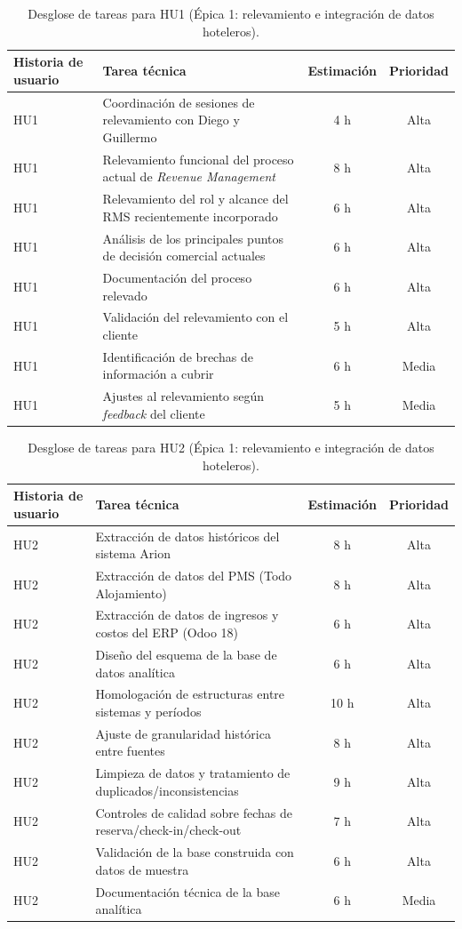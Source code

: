 \documentclass[
11pt, %
]{charter}
\begin{document}
\begin{table}[H]
\centering
\begin{tabularx}{\linewidth}{@{}|X|X|c|c|@{}}
\hline
\rowcolor[HTML]{C0C0C0}
Historia de usuario & Tarea técnica & Estimación & Prioridad \\ \hline
HU1 & Coordinación de sesiones de relevamiento con Diego y Guillermo & 4 h & Alta \\ \hline
HU1 & Relevamiento funcional del proceso actual de \textit{Revenue Management} & 8 h & Alta \\ \hline
HU1 & Relevamiento del rol y alcance del RMS recientemente incorporado & 6 h & Alta \\ \hline
HU1 & Análisis de los principales puntos de decisión comercial actuales & 6 h & Alta \\ \hline
HU1 & Documentación del proceso relevado & 6 h & Alta \\ \hline
HU1 & Validación del relevamiento con el cliente & 5 h & Alta \\ \hline
HU1 & Identificación de brechas de información a cubrir & 6 h & Media \\ \hline
HU1 & Ajustes al relevamiento según \textit{feedback} del cliente & 5 h & Media \\ \hline
\end{tabularx}
\caption{Desglose de tareas para HU1 (Épica 1: relevamiento e integración de datos hoteleros).}
\end{table}
 
\begin{table}[H]
\centering
\begin{tabularx}{\linewidth}{@{}|X|X|c|c|@{}}
\hline
\rowcolor[HTML]{C0C0C0}
Historia de usuario & Tarea técnica & Estimación & Prioridad \\ \hline
HU2 & Extracción de datos históricos del sistema Arion & 8 h & Alta \\ \hline
HU2 & Extracción de datos del PMS (Todo Alojamiento) & 8 h & Alta \\ \hline
HU2 & Extracción de datos de ingresos y costos del ERP (Odoo 18) & 6 h & Alta \\ \hline
HU2 & Diseño del esquema de la base de datos analítica & 6 h & Alta \\ \hline
HU2 & Homologación de estructuras entre sistemas y períodos & 10 h & Alta \\ \hline
HU2 & Ajuste de granularidad histórica entre fuentes & 8 h & Alta \\ \hline
HU2 & Limpieza de datos y tratamiento de duplicados/inconsistencias & 9 h & Alta \\ \hline
HU2 & Controles de calidad sobre fechas de reserva/check-in/check-out & 7 h & Alta \\ \hline
HU2 & Validación de la base construida con datos de muestra & 6 h & Alta \\ \hline
HU2 & Documentación técnica de la base analítica & 6 h & Media \\ \hline
\end{tabularx}
\caption{Desglose de tareas para HU2 (Épica 1: relevamiento e integración de datos hoteleros).}
\end{table}
 
\end{document}

